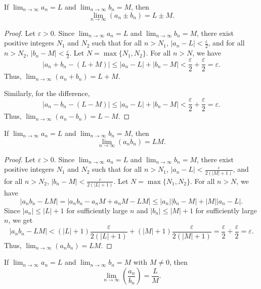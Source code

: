 \begin{theorem}
If $\lim_{n \to \infty} a_n = L$ and $\lim_{n \to \infty} b_n = M$, then
\[
\lim_{n \to \infty} (a_n \pm b_n) = L \pm M.
\]
\end{theorem}
\begin{proof}
Let $\varepsilon > 0$. Since $\lim_{n \to \infty} a_n = L$ and $\lim_{n \to \infty} b_n = M$, there exist positive integers $N_1$ and $N_2$ such that for all $n > N_1$, $|a_n - L| < \frac{\varepsilon}{2}$, and for all $n > N_2$, $|b_n - M| < \frac{\varepsilon}{2}$. Let $N = \max\{N_1, N_2\}$. For all $n > N$, we have
\[
|a_n + b_n - (L + M)| \leq |a_n - L| + |b_n - M| < \frac{\varepsilon}{2} + \frac{\varepsilon}{2} = \varepsilon.
\]
Thus, $\lim_{n \to \infty} (a_n + b_n) = L + M$.

Similarly, for the difference,
\[
|a_n - b_n - (L - M)| \leq |a_n - L| + |b_n - M| < \frac{\varepsilon}{2} + \frac{\varepsilon}{2} = \varepsilon.
\]
Thus, $\lim_{n \to \infty} (a_n - b_n) = L - M$.
\end{proof}
%
\begin{theorem}
If $\lim_{n \to \infty} a_n = L$ and $\lim_{n \to \infty} b_n = M$, then
\[
\lim_{n \to \infty} (a_n b_n) = LM.
\]
\end{theorem}
\begin{proof}
Let $\varepsilon > 0$. Since $\lim_{n \to \infty} a_n = L$ and $\lim_{n \to \infty} b_n = M$, there exist positive integers $N_1$ and $N_2$ such that for all $n > N_1$, $|a_n - L| < \frac{\varepsilon}{2(|M| + 1)}$, and for all $n > N_2$, $|b_n - M| < \frac{\varepsilon}{2(|L| + 1)}$. Let $N = \max\{N_1, N_2\}$. For all $n > N$, we have
\[
|a_n b_n - LM| = |a_n b_n - a_n M + a_n M - LM| \leq |a_n||b_n - M| + |M||a_n - L|.
\]
Since $|a_n| \leq |L| + 1$ for sufficiently large $n$ and $|b_n| \leq |M| + 1$ for sufficiently large $n$, we get
\[
|a_n b_n - LM| < (|L| + 1)\frac{\varepsilon}{2(|L| + 1)} + (|M| + 1)\frac{\varepsilon}{2(|M| + 1)} = \frac{\varepsilon}{2} + \frac{\varepsilon}{2} = \varepsilon.
\]
Thus, $\lim_{n \to \infty} (a_n b_n) = LM$.
\end{proof}
%
\begin{theorem}
If $\lim_{n \to \infty} a_n = L$ and $\lim_{n \to \infty} b_n = M$ with $M \neq 0$, then
\[
\lim_{n \to \infty} \left(\frac{a_n}{b_n}\right) = \frac{L}{M}.
\]
\end{theorem}
